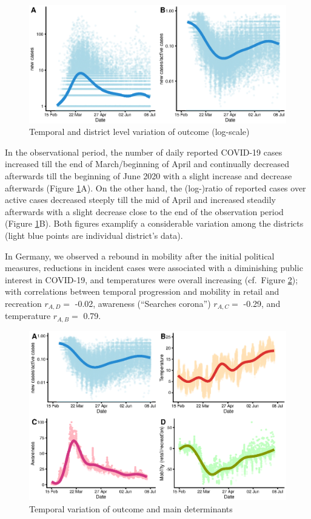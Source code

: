 \documentclass[]{elsarticle} %
\makeatletter
\def\maxwidth{\ifdim\Gin@nat@width>\linewidth\linewidth
\else\Gin@nat@width\fi}
\let\Oldincludegraphics\includegraphics
\renewcommand{\includegraphics}[1]{\Oldincludegraphics[width=\maxwidth]{#1}}
\makeatother
\begin{document}
\begin{figure}
\centering
\includegraphics{figures/f_timeseries_cases_and_lograte.eps}
\caption{\label{fig:cases-log}Temporal and district level variation of outcome (log-scale)}
\end{figure}

In the observational period, the number of daily reported COVID-19 cases increased till the end of March/beginning of April and continually decreased afterwards till the beginning of June 2020 with a slight increase and decrease afterwards (Figure \ref{fig:cases-log}A). On the other hand, the (log-)ratio of reported cases over active cases decreased steeply till the mid of April and increased steadily afterwards with a slight decrease close to the end of the observation period (Figure \ref{fig:cases-log}B). Both figures examplify a considerable variation among the districts (light blue points are individual district's data).

In Germany, we observed a rebound in mobility after the initial political measures, reductions in incident cases were associated with a diminishing public interest in COVID-19, and temperatures were overall increasing (cf.~Figure \ref{fig:timeseries}); with correlations between temporal progression and mobility in retail and recreation \(r_{A,D}=\) -0.02, awareness (``Searches corona'') \(r_{A,C}=\) -0.29, and temperature \(r_{A,B}=\) 0.79.

\begin{figure}
\centering
\includegraphics{figures/f_timeseries_exposures.eps}
\caption{\label{fig:timeseries}Temporal variation of outcome and main determinants}
\end{figure}
\end{document}
